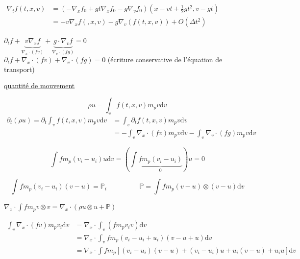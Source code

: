 \documentclass[12pt,a4paper]{article}
\begin{document}
\begin{enumerate}[label=\alph*)]
\begin{minipage}[t]{15cm}
{\begin{minipage}[t]{16cm}
				\vspace{.5cm}
				
				$\begin{aligned}
					\nabla_t f(t,x,v) &= \left(-\nabla_x f_0 + gt \nabla_x f_0 - g \nabla_v f_0\right)\left(x-vt+\frac12 gt^2,v-gt\right)\\
					&= -v \nabla_x f(,x,v) - g\nabla_v\left(f(t,x,v)\right) + O(\Delta t^2)
				\end{aligned}$
				
				\vspace{.5cm}
				
				$\partial_t f + \underbrace{v\nabla_x f}_{\nabla_x \cdot (fv)} + \underbrace{g\cdot\nabla_v f}_{\nabla_v \cdot (fg)} = 0$\\
				$\partial_t f + \nabla_x\cdot (fv) + \nabla_v\cdot (fg) = 0$ \hspace{1cm} (écriture conservative de l'équation de transport)
				
				\vspace{.5cm}
				
				\underline{quantité de mouvement}
				
				\[
				\rho u = \displaystyle\int_v f(t,x,v)m_p v \mathrm{d}v
				\]
				$
				\begin{aligned}
					\partial_t(\rho u) = \partial_t\displaystyle\int_v f(t,x,v) m_p v \mathrm{d}v &= \int_v \partial_t f(t,x,v) m_p v \mathrm{d}v \\
					&= - \int_v \nabla_x\cdot \left(fv\right) m_p v \mathrm{d}v - \int_v \nabla_v\cdot \left(fg\right) m_p v \mathrm{d}v 
				\end{aligned}$
				
				\[
				\displaystyle\int f m_p (v_i-u_i)u\mathrm{d}v = \left(\int \underbrace{fm_p (v_i-u_i)}_{0}\right)u = 0
				\]
				
				\[
				\displaystyle\int fm_p (v_i-u_i)(v-u) = \mathbb{P}_i \hspace{2cm} \mathbb P = \int fm_p(v-u)\otimes (v-u) \mathrm dv
				\]
				
				$\nabla_x \cdot \displaystyle\int f m_p v\otimes v = \nabla_x\cdot\left(\rho u\otimes u + \mathbb P\right)$
				
				\[
				\begin{aligned}
					\displaystyle \int_v \nabla_x\cdot(fv) m_p v_i \mathrm dv &= \nabla_x \cdot \int_v (fm_pv_i v)\mathrm dv \\
					&=\nabla_x\cdot \int_v fm_p \left(v_i-u_i+u_i\right)(v-u+u) \mathrm dv \\
					&= \nabla_x \cdot\int fm_p \left[(v_i-u_i)(v-u) + (v_i-u_i)u + u_i(v-u) + u_i u\right]\mathrm dv
				\end{aligned}
				\]
				

\end{minipage}}
\end{minipage}
\end{enumerate}
\end{document}
